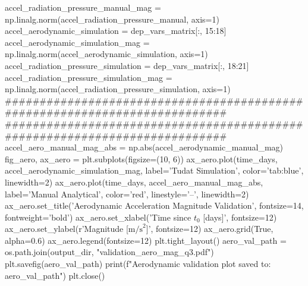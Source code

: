 {}accel_radiation_pressure_manual_mag = np.linalg.norm(accel_radiation_pressure_manual, axis=1)\markdownRendererInterblockSeparator
{}
\markdownRendererSectionEnd \markdownRendererSectionBegin
{}\markdownRendererInterblockSeparator
{}
\markdownRendererSectionEnd \markdownRendererSectionBegin
{}\markdownRendererInterblockSeparator
{}accel_aerodynamic_simulation = dep_vars_matrix[:, 15:18] accel_aerodynamic_simulation_mag = np.linalg.norm(accel_aerodynamic_simulation, axis=1)\markdownRendererInterblockSeparator
{}
\markdownRendererSectionEnd \markdownRendererSectionBegin
{}\markdownRendererInterblockSeparator
{}accel_radiation_pressure_simulation = dep_vars_matrix[:, 18:21] accel_radiation_pressure_simulation_mag = np.linalg.norm(accel_radiation_pressure_simulation, axis=1)\markdownRendererInterblockSeparator
{}
\markdownRendererSectionEnd \markdownRendererSectionBegin
{}\markdownRendererInterblockSeparator
{}###########################################################################\markdownRendererInterblockSeparator
{}
\markdownRendererSectionEnd \markdownRendererSectionBegin
{}\markdownRendererInterblockSeparator
{}###########################################################################\markdownRendererInterblockSeparator
{}
\markdownRendererSectionEnd \markdownRendererSectionBegin
{}\markdownRendererInterblockSeparator
{}accel_aero_manual_mag_abs = np.abs(accel_aerodynamic_manual_mag)\markdownRendererInterblockSeparator
{}
\markdownRendererSectionEnd \markdownRendererSectionBegin
\markdownRendererHeadingOne{-------------------------------------------------------------------------}\markdownRendererInterblockSeparator
{}
\markdownRendererSectionEnd \markdownRendererSectionBegin
{}\markdownRendererInterblockSeparator
{}
\markdownRendererSectionEnd \markdownRendererSectionBegin
\markdownRendererHeadingOne{-------------------------------------------------------------------------}\markdownRendererInterblockSeparator
{}fig_aero, ax_aero = plt.subplots(figsize=(10, 6)) ax_aero.plot(time_days, accel_aerodynamic_simulation_mag, label='Tudat Simulation', color='tab:blue', linewidth=2) ax_aero.plot(time_days, accel_aero_manual_mag_abs, label='Manual Analytical', color='red', linestyle='--', linewidth=2) ax_aero.set_title('Aerodynamic Acceleration Magnitude Validation', fontsize=14, fontweight='bold') ax_aero.set_xlabel('Time since $t_0$ [days]', fontsize=12) ax_aero.set_ylabel(r'Magnitude [$\mathrm{m/s}^2$]', fontsize=12) ax_aero.grid(True, alpha=0.6) ax_aero.legend(fontsize=12) plt.tight_layout() aero_val_path = os.path.join(output_dir, "validation_aero_mag_q3.pdf") plt.savefig(aero_val_path) print(f"Aerodynamic validation plot saved to: {aero_val_path}") plt.close()\markdownRendererInterblockSeparator
